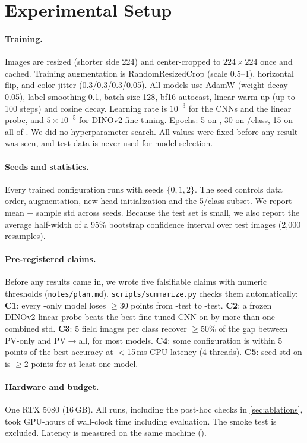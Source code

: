 \section{Experimental Setup}
\label{sec:setup}

\paragraph{Training.}
Images are resized (shorter side 224) and center-cropped to $224\times224$ once and cached. Training augmentation is RandomResizedCrop (scale 0.5--1), horizontal flip, and color jitter (0.3/0.3/0.3/0.05).
All models use AdamW (weight decay 0.05), label smoothing 0.1, batch size 128, bf16 autocast, linear warm-up (up to 100 steps) and cosine decay.
Learning rate is $10^{-3}$ for the CNNs and the linear probe, and $5\times10^{-5}$ for DINOv2 fine-tuning.
Epochs: 5 on \PV, 30 on /class, 15 on all of \PD.
We did no hyperparameter search. All values were fixed before any \PD result was seen, and \PD test data is never used for model selection.

\paragraph{Seeds and statistics.}
Every trained configuration runs with seeds $\{0,1,2\}$. The seed controls data order, augmentation, new-head initialization and the 5/class subset. We report mean $\pm$ sample std across seeds. Because the \PD test set is small, we also report the average half-width of a 95\% bootstrap confidence interval over test images (2{,}000 resamples).

\paragraph{Pre-registered claims.}
Before any results came in, we wrote five falsifiable claims with numeric thresholds (\texttt{notes/plan.md}). \texttt{scripts/summarize.py} checks them automatically:
\textbf{C1}: every \PV-only model loses $\ge$30 points from \PV-test to \PD-test.
\textbf{C2}: a frozen DINOv2 linear probe beats the best fine-tuned CNN on \PD by more than one combined std.
\textbf{C3}: 5 field images per class recover $\ge$50\% of the gap between PV-only and PV$\rightarrow$all, for most models.
\textbf{C4}: some configuration is within 5 points of the best \PD accuracy at $<$15\,ms CPU latency (4 threads).
\textbf{C5}: seed std on \PD is $\ge$2 points for at least one model.

\paragraph{Hardware and budget.}
One RTX 5080 (16\,GB). All \NumRuns runs, including the post-hoc checks in \cref{sec:ablations}, took \GPUHours GPU-hours of wall-clock time including evaluation. The smoke test is excluded.
Latency is measured on the same machine (\EdgeCPU).
